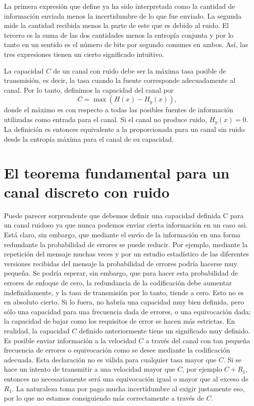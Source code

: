 La primera expresi\'{o}n que define ya ha sido interpretada como la
cantidad de informaci\'{o}n enviada menos la incertidumbre de lo que
fue enviado. La segunda mide la cantidad recibida menos la parte de
este que es debido al ruido. El tercero es la suma de las dos
cantidades menos la entrop\'{i}a conjunta y por lo tanto en un sentido
es el n\'{u}mero de bits por segundo comunes en ambos. As\'{i}, las
tres expresiones tienen un cierto significado intuitivo.

La capacidad $C$ de un canal con ruido debe ser la m\'{a}xima tasa
posible de transmisi\'{o}n, es decir, la tasa cuando la fuente
corresponde adecuadamente al canal. Por lo tanto, definimos la
capacidad del canal por
\begin{equation}
C = \max (H(x) - H_y(x)),
\end{equation}
donde el m\'{a}ximo es con respecto a todas las posibles fuentes de
informaci\'{o}n utilizadas como entrada para el canal. Si el canal no
produce ruido, $H_y(x) = 0$. La definici\'{o}n es entonces equivalente
a la proporcionada para un canal sin ruido desde la entrop\'{i}a
m\'{a}xima para el canal de su capacidad.

\clearpage

\chapter{El teorema fundamental para un canal discreto con ruido}
\label{sec:13}

Puede parecer sorprendente que debemos definir una capacidad definida
C para un canal ruidoso ya que nunca podemos enviar cierta
informaci\'{o}n en un caso as\'{\i}. Est\'{a} claro, sin embargo, que
mediante el env\'{\i}o de la informaci\'{o}n en una forma redundante
la probabilidad de errores se puede reducir. Por ejemplo, mediante la
repetici\'{o}n del mensaje muchas veces y por un estudio
estad\'{i}stico de las diferentes versiones recibidas del mensaje la
probabilidad de errores podr\'{i}a hacerse muy peque\~{n}a. Se
podr\'{i}a esperar, sin embargo, que para hacer esta probabilidad de
errores de enfoque de cero, la redundancia de la codificaci\'{o}n debe
aumentar indefinidamente, y la tasa de transmisi\'{o}n por lo tanto,
tiende a cero. Esto no es en absoluto cierto. Si lo fuera, no
habr\'{i}a una capacidad muy bien definida, pero s\'{o}lo una
capacidad para una frecuencia dada de errores, o una equivocaci\'{o}n
dada; la capacidad de bajar como los requisitos de error se hacen
m\'{a}s estrictas. En realidad, la capacidad $C$ definido
anteriormente tiene un significado muy definido. Es posible enviar
informaci\'{o}n a la velocidad $C$ a trav\'{e}s del canal con tan
peque\~{n}a frecuencia de errores o equivocaci\'{o}n como se desee
mediante la codificaci\'{o}n adecuada. Esta declaraci\'{o}n no es
v\'{a}lida para cualquier tasa mayor que $C$. Si se hace un intento de
transmitir a una velocidad mayor que $C$, por ejemplo $C + R_1$,
entonces no necesariamente ser\'{a} una equivocaci\'{o}n igual o mayor
que al exceso de $R_1$. La naturaleza toma por pago mucha
incertidumbre al exigir justamente eso, por lo que no estamos
consiguiendo m\'{a}s correctamente a trav\'{e}s de $C$.

